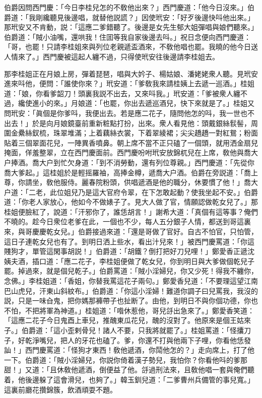 伯爵因問西門慶：「今日李桂兒怎的不敎他出來？」西門慶道：「他今日沒來。」伯爵道：「我剛纔聽見後邊唱，就替他説謊？」因使玳安：「好歹後邊快呌他出來。」那玳安又不肯動，説：「這應二爹錯聽了。後邊是女先生郁大姐彈唱與娘們聽來。」伯爵道：「賊小油嘴，還哄我！住囬等我自家後邊去呌。」祝日念便向西門慶道：「哥，也罷！只請李桂姐來與列位老親遞盃酒來，不敎他唱也罷。我曉的他今日送人情來了。」西門慶被這起人纏不過，只得使玳安往後邊請李桂姐去。

那李桂姐正在月娘上房，彈着琵琶，唱與大妗子、楊姑娘、潘姥姥衆人聽。見玳安進來呌他，便問：「誰使你來？」玳安道：「爹敎我來請桂姨上去遞一巡酒。」桂姐道：「娘，你看爹韶刀！頭裏我説不出去，又來呌我。」玳安道：「爹被衆人纏不過，纔使進小的來。」月娘道：「也罷，你出去遞巡酒兒，快下來就是了。」桂姐又問玳安：「眞個是你爹呌，我便出去。若是應二花子，隨問他怎的呌，我一世也不出去！」於是向月娘鏡臺前重新粧點打扮，出來。衆人看見他：頭戴銀絲䯼髻，周圍金纍絲釵梳，珠翠堆滿；上着藕絲衣裳，下着翠綾裙；尖尖趫趫一對紅鴛；粉面貼着三個翠面花兒，一陣異香噴鼻。朝上席不當不正只磕了一個頭，就用洒金扇兒掩面，佯羞整翠，立在西門慶面前。西門慶吩咐玳安放錦杌兒在上席，敎他與喬大户捧酒。喬大户到忙欠身道：「到不消勞動，還有列位尊親。」西門慶道：「先從你喬大爹起。」這桂姐於是輕摇羅袖，高捧金樽，遞喬大户酒。伯爵在旁説道：「喬上尊，你請坐，敎他服侍。麗春院粉頭，供唱遞酒是他的職分，休要慣了他！」喬大户道：「二老，此位姐兒乃是這大官府令翠，在下怎敢起動？使我坐起不安。」伯爵道：「你老人家放心，他如今不做婊子了。見大人做了官，情願認做乾女兒了。」那桂姐便臉紅了，說道：「汗邪你了，誰恁胡言！」謝希大道：「真個有這等事？俺們不曉的。趁今日衆位老爹在此，一個也不少，每人五分銀子人情，都送到哥這裏來，與哥慶慶乾女兒。」伯爵接過來道：「還是哥做了官好。自古不怕官，只怕管，這日子連乾女兒也有了。到明日洒上些水，看出汁兒來！」被西門慶罵道：「你這賤狗才，單管這閑事胡説！」伯爵道：「胡鐵？倒打把好刀兒哩！」鄭愛香正遞沈姨夫酒，插口道：「應二花子，李桂姐便做了乾女兒，你到明日與大爹做個乾兒子罷。掉過來，就是個兒乾子。」伯爵罵道：「賊小淫婦兒，你又少死！得我不纏你，念佛。」李桂姐道：「香姐，你替我罵這花子兩句。」鄭愛香兒道：「不要理這望江南巴山虎兒，汗東山斜紋布。」伯爵道：「你這小淫婦！難道你調子曰兒罵我，我沒的説，只是一味㒲鬼，把你媽那褲帶子也扯断了。由他，到明日不與你個功德，你也不怕，不把將軍為神道。」桂姐道：「喒休惹他，哥兒㧱出急來了。」鄭愛香笑道：「這應二花子今日鬼酉上車兒，推醜東瓜花兒，醜的沒對了。他原來是個王姑來子。」伯爵道：「這小歪剌骨兒！諸人不要，只我將就罷了。」桂姐罵道：「怪攮刀子，好乾淨嘴兒，把人的牙花也磕了。爹，你還不打與他兩下子哩，你看他恁發訕！」西門慶罵道：「怪狗才東西！敎他遞酒，你鬦他怎的？」走向席上，打了他一下。伯爵道：「賊小淫婦兒，你説你倚着漢子勢兒，我怕你？你看他呌的爹那甜！」又道：「且休敎他遞酒，倒便益了他。㧱過刑法來，且敎他唱一套與俺們聽着，他後邊躲了這會滑兒，也夠了。」韓玉釧兒道：「二爹曹州兵備管的事兒寬。」這裏前廳花攢錦簇，飲酒頑耍不題。

